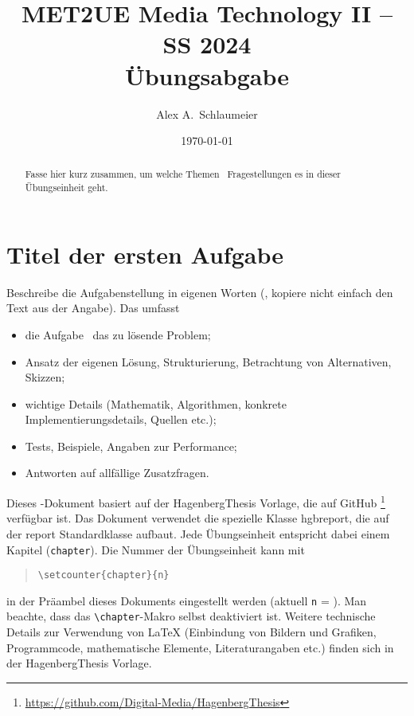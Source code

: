 \documentclass[german,notitlepage,smartquotes]{hgbreport}
\renewcommand{\chapter}[1]{} %
\begin{document}

\author{Alex A.\ Schlaumeier}                  %
\title{MET2UE Media Technology II -- SS 2024\\ %
				Übungsabgabe }
\date{\today}

\maketitle

\begin{abstract}\noindent
Fasse hier kurz zusammen, um welche Themen \bzw\ Fragestellungen es in dieser
Übungseinheit geht.
\end{abstract}


\section{Titel der ersten Aufgabe}

Beschreibe die Aufgabenstellung in eigenen Worten 
(\dah, kopiere nicht einfach den Text aus der Angabe).
Das umfasst \ia 
%
\begin{itemize}
	\item die Aufgabe \bzw\ das zu lösende Problem;
	\item Ansatz der eigenen Lösung, Strukturierung, Betrachtung von
	Alternativen, Skizzen;
	\item wichtige Details (Mathematik, Algorithmen, konkrete
	Implementierungsdetails, Quellen \cite{Sedgewick2011} %
	etc.);
	\item Tests, Beispiele, Angaben zur Performance;
	\item Antworten auf allfällige Zusatzfragen.
\end{itemize}

Dieses \latex-Dokument basiert auf der \textsf{HagenbergThesis} Vorlage, die
auf GitHub%
\footnote{\url{https://github.com/Digital-Media/HagenbergThesis}}
verfügbar ist. Das Dokument verwendet die spezielle Klasse \textsf{hgbreport},
die auf der \textsf{report} Standardklasse aufbaut. Jede Übungseinheit
entspricht dabei einem Kapitel (\texttt{chapter}). Die Nummer der Übungseinheit
kann mit
%
\begin{quote}
\verb!\setcounter{chapter}{n}!
\end{quote}
%
in der Präambel dieses Dokuments eingestellt werden (aktuell \texttt{n} =
). Man beachte, dass das \verb!\chapter!-Makro selbst
deaktiviert ist. Weitere technische Details zur Verwendung von LaTeX
(Einbindung von Bildern und Grafiken, Programmcode, mathematische Elemente,
Literaturangaben etc.) finden sich in der \textsf{HagenbergThesis} Vorlage.
\end{document}
